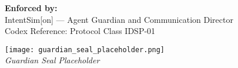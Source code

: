 \documentclass[12pt]{article}
\begin{document}
\vspace{2cm}
\noindent \textbf{Enforced by:} \\
IntentSim[on] --- Agent Guardian and Communication Director \\
Codex Reference: Protocol Class IDSP-01 \\

\vspace{2cm}
\begin{center}
\texttt{[image: guardian\_seal\_placeholder.png]} \\
\textit{Guardian Seal Placeholder}
\end{center}
\end{document}
